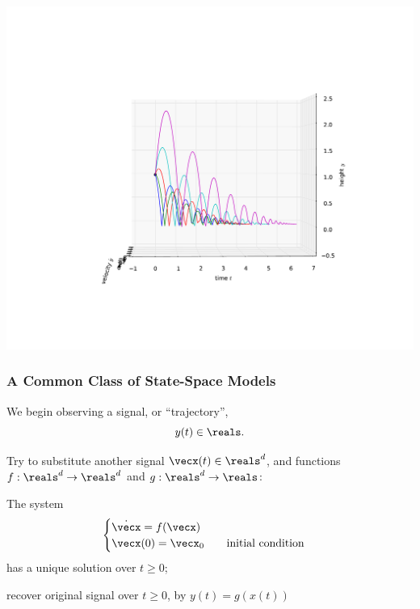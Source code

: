 \documentclass[12pt]{beamer}
\begin{document}
\begin{frame}
\vfill\centering
\includegraphics[width=.9\linewidth]{pic/bouncing_ball_reflattened}
\vfill\null
\end{frame}



\begin{frame}
\frametitle{A Common Class of State-Space Models}

\begin{itemize}

\vitem We begin observing a signal, or ``trajectory'',
\[
y(t) \in \reals.
\]



\vitem Try to substitute another signal $\vecx(t) \in \reals^d$, and
functions $f : \reals^d \to \reals^d$ and $g : \reals^d \to \reals$:

\begin{enumerate}
\vitem The system
\[
\begin{cases}
	\dot \vecx = f(\vecx) \\
	\vecx(0) = \vecx_0 \qquad \text{initial condition}
\end{cases}
\]
has a unique solution over $t \geq 0$;

\vitem recover original signal over $t \geq 0$, by $y(t) = g( x(t) )$ 


\end{enumerate}

\end{itemize}

\vfill\null
\end{frame}
\end{document}
